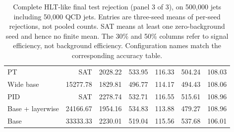 \begin{table}[htbp]
\begin{tabularx}{\linewidth}{@{}Xrrrrrr@{}}
PT & SAT & 2028.22 & 533.95 & 116.33 & 504.24 & 108.03 \\ %
Wide base & 15277.78 & 1829.81 & 496.77 & 114.17 & 494.43 & 108.06 \\ %
PID & SAT & 2278.74 & 532.71 & 116.55 & 515.61 & 108.96 \\ %
Base + layerwise & 24166.67 & 1954.16 & 534.83 & 113.88 & 479.27 & 108.96 \\ %
Base & 33333.33 & 2230.01 & 519.04 & 115.56 & 537.68 & 106.01 \\ %
\bottomrule
\end{tabularx}
\caption{Complete HLT-like final test rejection (panel 3 of 3),
on 500,000 jets including 50,000 QCD jets. Entries are three-seed means of per-seed rejections, not pooled counts.
SAT means at least one zero-background seed and hence no finite mean.
The 30\% and 50\% columns refer to signal efficiency, not background
efficiency. Configuration names match the corresponding accuracy table.}
\label{tab:hlt-hlt-rejection-3}
\end{table}
